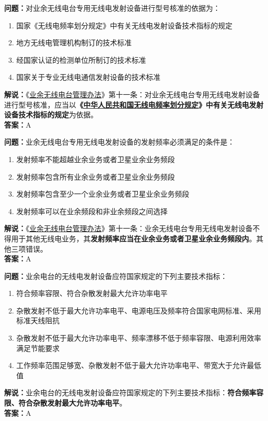 \textbf{问题：}对业余无线电台专用无线电发射设备进行型号核准的依据为：
\begin{enumerate}[label=\Alph*), leftmargin=1cm]
	\item 国家《无线电频率划分规定》中有关无线电发射设备技术指标的规定
	\item 地方无线电管理机构制订的技术标准
	\item 经国家认证的检测单位所制订的技术标准
	\item 国家关于专业无线电通信发射设备的技术标准
\end{enumerate}
\textbf{解说：}《\href{https://www.miit.gov.cn/jgsj/zfs/bmgz/art/2020/art_147b69815b3641caad9047735f94c860.html}{业余无线电台管理办法}》第十一条：对业余无线电台专用无线电发射设备进行型号核准，应当以\textbf{《\href{https://www.miit.gov.cn/zwgk/zcwj/wjfb/txy/art/2020/art_066386284cd2449493586c81ccafed11.html}{中华人民共和国无线电频率划分规定}》中有关无线电发射设备技术指标的规定}为依据。\\\textbf{答案：}A

\textbf{问题：}业余无线电台专用无线电发射设备的发射频率必须满足的条件是：
\begin{enumerate}[label=\Alph*), leftmargin=1cm]
	\item 发射频率不能超越业余业务或者卫星业余业务频段
	\item 发射频率包含所有业余业务或者卫星业余业务频段
	\item 发射频率包含至少一个业余业务或者卫星业余业务频段
	\item 发射频率可以在业余频段和非业余频段之间选择
\end{enumerate}
\textbf{解说：}《\href{https://www.miit.gov.cn/jgsj/zfs/bmgz/art/2020/art_147b69815b3641caad9047735f94c860.html}{业余无线电台管理办法}》第十一条：业余无线电台专用无线电发射设备不得用于其他无线电业务，其\textbf{发射频率应当在业余业务或者卫星业余业务频段内}。其他三项错误。\\\textbf{答案：}A

\textbf{问题：}业余电台的无线电发射设备应符国家规定的下列主要技术指标：
\begin{enumerate}[label=\Alph*), leftmargin=1cm]
	\item 符合频率容限、符合杂散发射最大允许功率电平
	\item 杂散发射不低于最大允许功率电平、电源电压及频率符合国家电网标准、采用标准天线阻抗
	\item 杂散发射不低于最大允许功率电平、频率漂移不低于频率容限、电源利用效率满足节能要求
	\item 工作频率范围足够宽、杂散发射不低于最大允许功率电平、带宽大于允许最低值
\end{enumerate}
\textbf{解说：}业余电台的无线电发射设备应符国家规定的下列主要技术指标：\textbf{符合频率容限、符合杂散发射最大允许功率电平}。\\\textbf{答案：}A%

